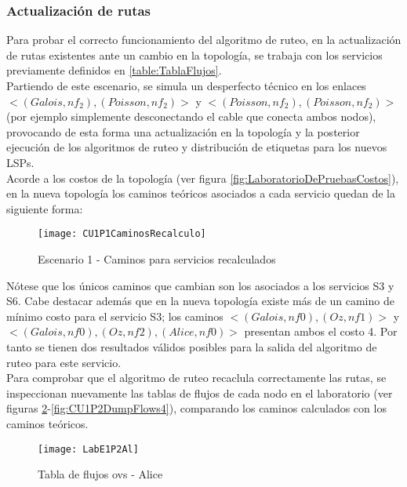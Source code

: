 \newpage
\subsubsection{Actualizaci\'on de rutas}
Para probar el correcto funcionamiento del algoritmo de ruteo, en la actualizaci\'on de rutas existentes ante un cambio en la topolog\'ia, se trabaja con los servicios previamente definidos en \ref{table:TablaFlujos}.\\ 

Partiendo de este escenario, se simula un desperfecto t\'ecnico en los enlaces \\ $<(Galois, nf_2), (Poisson, nf_2)>$ y  $<(Poisson, nf_2), (Poisson, nf_2)>$ (por ejemplo simplemente desconectando el cable que conecta ambos nodos), provocando de esta forma una actualizaci\'on en la topolog\'ia y la posterior ejecuci\'on de los algoritmos de ruteo y distribución de etiquetas para los nuevos LSPs.\\ 
 
Acorde a los costos de la topolog\'ia (ver figura \ref{fig:LaboratorioDePruebasCostos}), en la nueva topolog\'ia los caminos te\'oricos asociados a cada servicio quedan de la siguiente forma:

\newpage
\begin{figure}[ht!] 
\centering    
\texttt{[image: CU1P1CaminosRecalculo]}
\caption[Escenario 1 - Caminos para servicios recalculados]{Escenario 1 - Caminos para servicios recalculados}
\label{fig:CUP1Caminos2}
\end{figure}
 
N\'otese que los \'unicos caminos que cambian son los asociados a los servicios S3 y S6. Cabe destacar adem\'as que en la nueva topolog\'ia existe m\'as de un camino de m\'inimo costo para el servicio S3; los caminos $<(Galois, nf0), (Oz, nf1)>$ y $<(Galois, nf0), (Oz, nf2), (Alice, nf0)>$ presentan ambos el costo 4. Por tanto se tienen dos resultados v\'alidos posibles para la salida del algoritmo de ruteo para este servicio.\\

Para comprobar que el algoritmo de ruteo recaclula correctamente las rutas, se inspeccionan nuevamente las tablas de flujos de cada nodo en el laboratorio (ver figuras \ref{fig:CU1P2DumpFlows1}-\ref{fig:CU1P2DumpFlows4}), comparando los caminos calculados con los caminos te\'oricos.\\

\begin{figure}[h] 
\centering    
\texttt{[image: LabE1P2Al]}
\caption[Tabla de flujos ovs - Alice]{Tabla de flujos ovs - Alice}
\label{fig:CU1P2DumpFlows1}
\end{figure}

